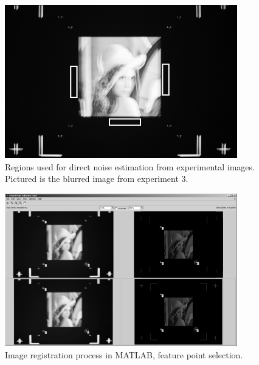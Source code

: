 \documentclass[12pt,notitlepage]{report}
\begin{document}
\begin{figure}[h]
 \centering
  \includegraphics[width=0.9\textwidth]{noise_estimation_regions.png}
 \caption[Regions used for direct noise estimation from experimental images]{Regions used for direct noise estimation from experimental images. Pictured is the blurred image from experiment 3.}
 \label{fig:noise_estimation_regions}
\end{figure}


\begin{figure}[h]
 \centering
  \includegraphics[width=0.9\textwidth]{registration_process.png}
 \caption[Image registration process in MATLAB, feature point selection]{Image registration process in MATLAB, feature point selection.}
 \label{fig:registration_process}
\end{figure}

\end{document}
